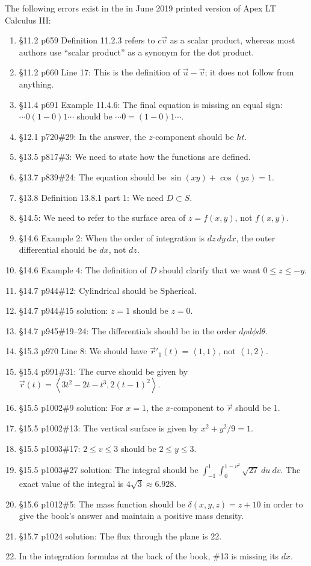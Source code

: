 \documentclass{amsart}
\newcommand{\bracket}[1]{\left\langle#1\right\rangle}
\begin{document}
\noindent
The following errors exist in the in June 2019 printed version of Apex LT Calculus III:
\begin{enumerate}
\item \S11.2 p659 Definition 11.2.3 refers to $c\vec v$ as a scalar product, whereas most authors use ``scalar product'' as a synonym for the dot product.
\item \S11.2 p660 Line 17: This is the definition of $\vec u-\vec v$; it does not follow from anything.
\item \S11.4 p691 Example 11.4.6: The final equation is missing an equal sign: $\dotsm0(1-0)1\dotsb$ should be $\dotsm0=(1-0)1\dotsb$.
\item \S12.1 p720\#29: In the answer, the $z$-component should be $ht$.
\item \S13.5 p817\#3: We need to state how the functions are defined.
\item \S13.7 p839\#24: The equation should be $\sin(xy)+\cos(yz)=1$.
\item \S13.8 Definition 13.8.1 part 1: We need $D\subset S$.
\item \S14.5: We need to refer to the surface area of $z=f(x,y)$, not $f(x,y)$.
\item \S14.6 Example 2: When the order of integration is $dz\,dy\,dx$, the outer differential should be $dx$, not $dz$.
\item \S14.6 Example 4: The definition of $D$ should clarify that we want $0\le z\le-y$.
\item \S14.7 p944\#12: Cylindrical should be Spherical.
\item \S14.7 p944\#15 solution: $z=1$ should be $z=0$.
\item \S14.7 p945\#19--24: The differentials should be in the order $d\rho d\phi d\theta$.
\item \S15.3 p970 Line 8: We should have $\vec r'_1(t)=\bracket{1,1}$, not $\bracket{1,2}$.
\item \S15.4 p991\#31: The curve should be given by $\vec r(t)=\bracket{3t^2-2t-t^3,2(t-1)^2}$.
\item \S15.5 p1002\#9 solution: For $x=1$, the $x$-component to $\vec r$ should be 1.
\item \S15.5 p1002\#13: The vertical surface is given by $x^2+y^2/9=1$.
\item \S15.5 p1003\#17: $2\le v\le3$ should be $2\le y\le3$.
\item \S15.5 p1003\#27 solution: The integral should be $\int_{-1}^1\int_0^{1-v^2}\sqrt{27}\ du\ dv$. The exact value of the integral is $4\sqrt3\approx6.928$.
\item \S15.6 p1012\#5: The mass function should be $\delta(x,y,z)=z+10$ in order to give the book's answer and maintain a positive mass density.
\item \S15.7 p1024 solution: The flux through the plane is 22.
\item In the integration formulas at the back of the book, \#13 is missing its $dx$.
\label{2019-06-00IIIplus}
\end{enumerate}
\end{document}
